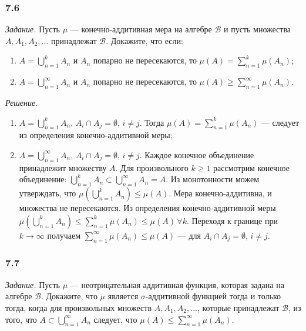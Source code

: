 \subsubsection*{7.6}

\textit{Задание.} Пусть $ \mu $ --- конечно-аддитивная мера на алгебре $ \mathcal{B} $ и пусть множества $A, A_1, A_2, \dotsc $ принадлежат $ \mathcal{B} $.
Докажите, что если:
\begin{enumerate}[label=\alph*)]
\item $A = \bigcup \limits_{n=1}^k A_n$ и $A_n$ попарно не пересекаются, то $ \mu \left( A \right) = \sum \limits_{n=1}^k \mu \left( A_n \right) $;
\item $A = \bigcup \limits_{n=1}^{ \infty } A_n$ и $A_n$ попарно не пересекаются, то $ \mu \left( A \right) \geq \sum \limits_{n=1}^{ \infty } \mu \left( A_n \right) $.
\end{enumerate}

\textit{Решение.}
\begin{enumerate}[label=\alph*)]
\item $A = \bigcup \limits_{n=1}^k A_n, \, A_i \cap A_j = \emptyset, \, i \neq j$.
Тогда $ \mu \left( A \right) = \sum \limits_{n=1}^k \mu \left( A_n \right) $ --- следует из определения конечно-аддитивной меры;
\item $A = \bigcup \limits_{n=1}^{ \infty } A_n, \, A_i \cap A_j = \emptyset, \, i \neq j$.
Каждое конечное объединение принадлежит множеству $A$.
Для произвольного $k \geq 1$ рассмотрим конечное объединение: $ \bigcup \limits_{n=1}^k A_n \subset \bigcup \limits_{n=1}^{ \infty } A_n = A$.
Из монотонности можем утверждать, что $ \mu \left( \bigcup \limits_{n=1}^k A_n \right) \leq \mu \left( A \right) $.
Мера конечно-аддитивна, и множества не пересекаются.
Из определения конечно-аддитивной меры
$ \mu \left( \bigcup \limits_{n=1}^k A_n \right) \leq
\sum \limits_{n=1}^k \mu \left( A_n \right) \leq
\mu \left( A \right) \,
\forall k$.
Переходя к границе при $ k \rightarrow \infty $ получаем $ \sum \limits_{n=1}^{ \infty } \mu \left( A_n \right) \leq \mu \left( A \right) $ ---
для $A_i \cap A_j = \emptyset, \, i \neq j$.
\end{enumerate}

\subsubsection*{7.7}

\textit{Задание.} Пусть $ \mu $ --- неотрицательная аддитивная функция, которая задана на алгебре $ \mathcal{B} $.
Докажите, что $ \mu $ является $ \sigma $-аддитивной функцией тогда и только тогда,
когда для произвольных множеств $A, A_1, A_2, \dotsc $,
которые принадлежат $ \mathcal{B} $, из того,
что $A \subset \bigcup \limits_{n=1}^{ \infty } A_n$ следует, что $ \mu \left( A \right) \leq \sum \limits_{n=1}^{ \infty } \mu \left( A_n \right) $.

